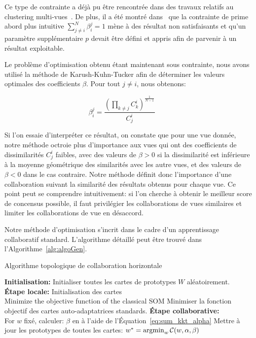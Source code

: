 \documentclass[a4paper]{article}
\begin{document}
Ce type de contrainte a déjà pu être rencontrée dans des travaux relatifs au clustering multi-vues~\cite{CarvalhoML15}. De plus, il a été montré dans~\cite{Sublime2017} que la contrainte de prime abord plus intuitive $\sum_{j \neq i}^N \beta^j_i = 1$ mène à des résultat non satisfaisants et qu'un paramètre supplémentaire $p$ devait être défini et appris  afin de parvenir à un résultat exploitable.

Le problème d'optimisation obtenu étant maintenant sous contrainte, nous avons utilisé la méthode de Karush-Kuhn-Tucker afin de déterminer les valeurs optimales des coefficients $\beta$. Pour tout $j \neq i$, nous obtenons:

\begin{equation}
\beta^j_i =  \frac{{(\prod_{k\neq j} C_k^i)}^{\frac 1 {N-1}}} {C_j^i} \qquad
\label{eq:sum_kkt_alpha}
\end{equation} 

Si l'on essaie d'interpréter ce résultat, on constate que pour une vue donnée, notre méthode octroie plus d'importance aux vues qui ont des coefficients de dissimilarités $C_j^i$ faibles, avec des valeurs de $\beta>0$ si la dissimilarité est inférieure à la moyenne géométrique des similarités avec les autre vues, et des valeurs de $\beta<0$ dans le cas contraire. Notre méthode définit donc l'importance d'une collaboration suivant la similarité des résultats obtenus pour chaque vue. Ce point peut se comprendre intuitivement: si l'on cherche à obtenir le meilleur score de concensus possible, il faut privilégier les collaborations de vues similaires et limiter les collaborations de vue en désaccord.

Notre méthode d'optimisation s'incrit dans le cadre d'un apprentissage collaboratif standard. L'algorithme détaillé peut être trouvé dans l'Algorithme~\ref{alg:algoGen}.

\begin{algorithm}[!h]
\label{alg:algoGen}
\SetAlgoLined{}
	\vspace{0.05cm}
	\caption{Algorithme topologique de collaboration horizontale}
	\vspace{0.05cm}
	\textbf{Initialisation:} Initialiser toutes les cartes de prototypes $W$ aléatoirement. \\
	\textbf{Étape locale:} Initialisation des cartes\\
	 {
		Minimize the objective function of the classical SOM
        Minimiser la fonction objectif des cartes auto-adaptatrices standards.
	} 
	\textbf{Étape collaborative:}\\
	 {
        For $w$ fixé, calculer:
        $\beta$ en à l'aide de l'Équation~\ref{eq:sum_kkt_alpha}
        Mettre à jour les prototypes de toutes les cartes:
		$ 
		w^{*} =  \operatornamewithlimits{argmin}_{w}\mathcal{C}(w,\alpha,\beta) 
		$
	}	 
\end{algorithm}
\end{document}
